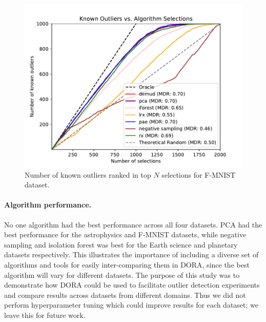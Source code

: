 \documentclass[letterpaper]{article} %
\begin{document}
\begin{figure}
    \centering
    \includegraphics[width=\linewidth]{figures/fmnist_combined_plot.pdf}
    \caption{Number of known outliers ranked in top $N$ selections for 
    F-MNIST dataset.}
    \label{fig:fmnist_results}
\end{figure}

\paragraph{Algorithm performance.} 
No one algorithm  
 had the best performance across all four datasets. PCA had
the best performance for the astrophysics and F-MNIST datasets, 
while negative sampling and isolation forest was best for
the Earth science and planetary datasets respectively. This illustrates
the importance of including a diverse set of algorithms and tools for
easily inter-comparing them in DORA, since the best
algorithm will vary for different datasets. The purpose of this study
was to demonstrate how DORA could be used to facilitate 
outlier detection experiments and compare results across datasets from 
different domains. Thus we did not perform hyperparameter tuning which
could improve results for each dataset; we leave this for future work.
 
\end{document}
